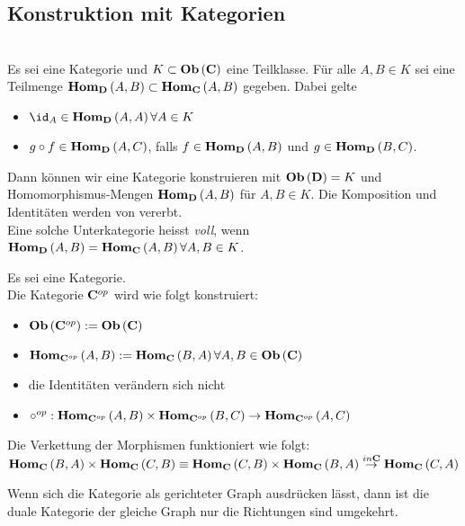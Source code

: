 \documentclass{article}
\begin{document}
\begin{bsp}[Fundamentalgruppoid]
\section{Konstruktion mit Kategorien}

\begin{defi}[Unterkategorie] {\cite[Definition 2.6.1]{Bra}} \\
Es sei \CatC eine Kategorie und \( K \subset  \mathbf{Ob} \left(\mathbf{C}\right) \) eine Teilklasse. F\"ur alle \( A,B \in K \) sei eine Teilmenge
\(
	 \mathbf{Hom } _\mathbf{D} \left( A, B \right) \subset  \mathbf{Hom } _\mathbf{C} \left( A, B \right)
\)
gegeben. Dabei gelte
\begin{itemize}
	\item \( \id_A \in \Hom_\CatD \left( A, A \right) \forall A \in K \)
	\item \( g \circ f \in   \mathbf{Hom } _\mathbf{D} \left( A,C \right) \), 
		falls \( f \in  \mathbf{Hom } _\mathbf{D} \left( A, B \right) \) und  
		\( g \in  \mathbf{Hom } _\mathbf{D} \left( B , C \right) \).
\end{itemize}

Dann k\"onnen wir eine Kategorie \CatD konstruieren mit \(  \mathbf{Ob}  \left( \mathbf{D} \right) = K \) und Homomorphismus-Mengen \(  \mathbf{Hom } _\mathbf{D} \left(A,B \right) \) f\"ur \( A,B \in K \). Die Komposition und Identit\"aten werden von \CatC vererbt.
\\
Eine solche Unterkategorie heisst \emph{voll}, wenn \(  \mathbf{Hom } _\mathbf{D} \left( A,B \right) =  \mathbf{Hom } _\mathbf{C} \left(A,B \right) \forall A,B \in K \). \\
 
 
\begin{defi} {\cite[Definition 2.6.3]{Bra}}
	Es sei \CatC eine Kategorie.  \\
	Die Kategorie \( \mathbf{C}^{op} \) wird wie folgt konstruiert:
	\begin{itemize}
		\item \(  \mathbf{Ob}  \left( \mathbf{C}^{op} \right) :=  \mathbf{Ob}  \left( \mathbf{C} \right) \)
		\item \(  \mathbf{Hom } _{\mathbf{C}^{op}} \left( A,B \right) :=  \mathbf{Hom } _\mathbf{C} \left( B,A \right) \forall A,B \in  \mathbf{Ob}  \left( \mathbf{C} \right) \)
		\item  die Identit\"aten ver\"andern sich nicht
		\item \( \circ^{op}:      \mathbf{Hom } _{\mathbf{C}^{op}} \left( A,B \right) \times   \mathbf{Hom } _{\mathbf{C}^{op}} \left( B,C \right) \to   \mathbf{Hom } _{\mathbf{C}^{op}} \left( A,C \right) \)
	\end{itemize}
	Die Verkettung der Morphismen funktioniert wie folgt: \\
	\(  \mathbf{Hom } _\mathbf{C} \left(B,A \right) \times  \mathbf{Hom } _\mathbf{C} \left(C,B \right) \equiv  \mathbf{Hom } _\mathbf{C} \left(C,B \right) \times  \mathbf{Hom } _\mathbf{C} \left(B,A \right) \overset{in \mathbf{C}}{\to}  \mathbf{Hom } _\mathbf{C} \left(C,A \right) \)
\end{defi}
	Wenn sich die Kategorie als gerichteter Graph ausdr\"ucken l\"asst, dann ist die duale Kategorie der gleiche Graph nur die Richtungen sind umgekehrt.
	

\end{defi}
\end{bsp}
\end{document}
